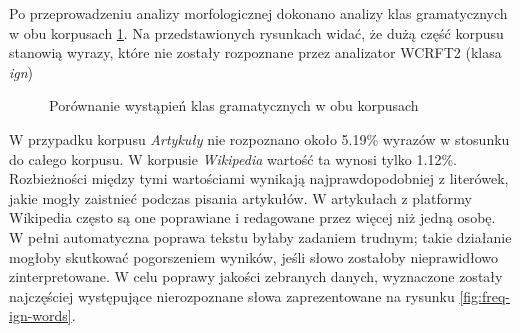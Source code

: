 Po przeprowadzeniu analizy morfologicznej dokonano analizy klas gramatycznych w obu korpusach \ref{fig:corpus-ign}. Na przedstawionych rysunkach widać, że dużą część korpusu stanowią wyrazy, które nie zostały rozpoznane przez analizator WCRFT2 (klasa \textit{ign})
\begin{figure}[ht!]
	\centering
    \qquad
	\caption{Porównanie wystąpień klas gramatycznych w obu korpusach}
    \label{fig:corpus-ign}
\end{figure}

W przypadku korpusu \textit{Artykuły} nie rozpoznano około 5.19\% wyrazów w stosunku do całego korpusu. W korpusie \textit{Wikipedia} wartość ta wynosi tylko 1.12\%. Rozbieżności między tymi wartościami wynikają najprawdopodobniej z literówek, jakie mogły zaistnieć podczas pisania artykułów. W artykułach z platformy Wikipedia często są one poprawiane i redagowane przez więcej niż jedną osobę. 
W pełni automatyczna poprawa tekstu byłaby zadaniem trudnym; takie działanie mogłoby skutkować pogorszeniem wyników, jeśli słowo zostałoby nieprawidłowo zinterpretowane. W celu poprawy jakości zebranych danych, wyznaczone zostały najczęściej występujące nierozpoznane słowa zaprezentowane na rysunku \ref{fig:freq-ign-words}.

